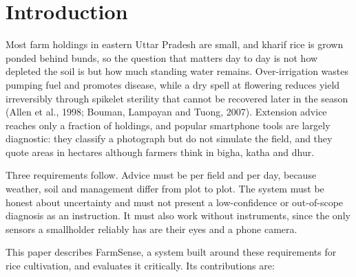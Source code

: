 \documentclass[11pt,a4paper]{article}
\begin{document}
\section{Introduction}

Most farm holdings in eastern Uttar Pradesh are small, and kharif rice is grown ponded behind bunds, so the question that matters day to day is not how depleted the soil is but how much standing water remains. Over-irrigation wastes pumping fuel and promotes disease, while a dry spell at flowering reduces yield irreversibly through spikelet sterility that cannot be recovered later in the season (Allen et al., 1998; Bouman, Lampayan and Tuong, 2007). Extension advice reaches only a fraction of holdings, and popular smartphone tools are largely diagnostic: they classify a photograph but do not simulate the field, and they quote areas in hectares although farmers think in bigha, katha and dhur.

Three requirements follow. Advice must be per field and per day, because weather, soil and management differ from plot to plot. The system must be honest about uncertainty and must not present a low-confidence or out-of-scope diagnosis as an instruction. It must also work without instruments, since the only sensors a smallholder reliably has are their eyes and a phone camera.

This paper describes FarmSense, a system built around these requirements for rice cultivation, and evaluates it critically. Its contributions are:
\end{document}
